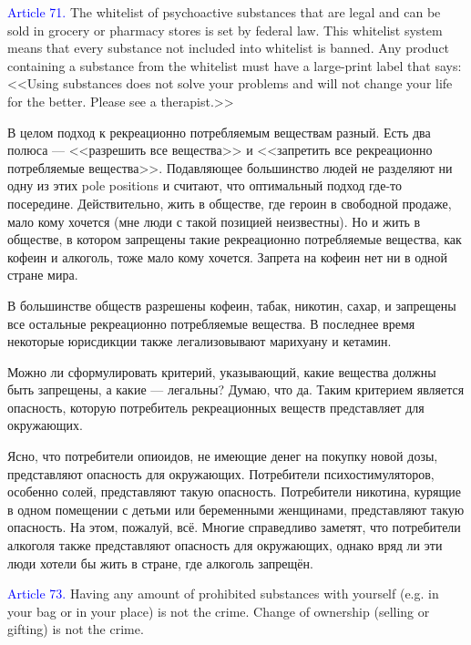 \documentclass[11pt]{article}
\theoremstyle{remark}
\theoremstyle{definition}
\begin{document}
\textcolor{blue}{Article 71.} The whitelist of psychoactive substances that are legal and can be sold in grocery or pharmacy stores is set by federal law. This whitelist system means that every substance not included into whitelist is banned. Any product containing a substance from the whitelist must have a large-print label that says: <<Using substances does not solve your problems and will not change your life for the better. Please see a therapist.>> 








В целом подход к рекреационно потребляемым веществам разный. Есть два полюса --- <<разрешить все вещества>> и <<запретить все рекреационно потребляемые вещества>>. Подавляющее большинство людей не разделяют ни одну из этих pole positions и считают, что оптимальный подход где-то посередине. Действительно, жить в обществе, где героин в свободной продаже, мало кому хочется (мне люди с такой позицией неизвестны). Но и жить в обществе, в котором запрещены такие рекреационно потребляемые вещества, как кофеин и алкоголь, тоже мало кому хочется. Запрета на кофеин нет ни в одной стране мира.

В большинстве обществ разрешены кофеин, табак, никотин, сахар, и запрещены все остальные рекреационно потребляемые вещества. В последнее время некоторые юрисдикции также легализовывают марихуану и кетамин.

Можно ли сформулировать критерий, указывающий, какие вещества должны быть запрещены, а какие --- легальны? Думаю, что да. Таким критерием является опасность, которую потребитель рекреационных веществ представляет для окружающих.

Ясно, что потребители опиоидов, не имеющие денег на покупку новой дозы, представляют опасность для окружающих. Потребители психостимуляторов, особенно солей, представляют такую опасность. Потребители никотина, курящие в одном помещении с детьми или беременными женщинами, представляют такую опасность. На этом, пожалуй, всё. Многие справедливо заметят, что потребители алкоголя также представляют опасность для окружающих, однако вряд ли эти люди хотели бы жить в стране, где алкоголь запрещён.



\textcolor{blue}{Article 73.} Having any amount of prohibited substances with yourself (e.g. in your bag or in your place) is not the crime. Change of ownership (selling or gifting) is not the crime. %
\end{document}

